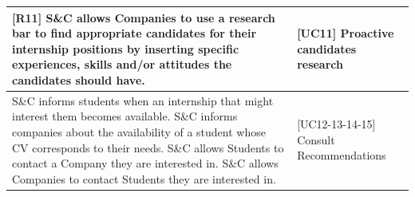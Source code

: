 \begin{table}[H]
\begin{tabular}{|p{10cm}|p{5cm}|}
         [R11] S\&C allows Companies to use a research bar to find appropriate candidates for their internship positions by inserting specific experiences, skills and/or attitudes the candidates should have. & [UC11] Proactive candidates research\\\hline
         [R12] S\&C informs students when an internship that might interest them becomes available. \newline [R13] S\&C informs companies about the availability of a student whose CV corresponds to their needs. \newline [R14] S\&C allows Students to contact a Company they are interested in. \newline [R15] S\&C allows Companies to contact Students they are interested in. & [UC12-13-14-15] Consult Recommendations\\\hline
     \end{tabular}
\end{table}
